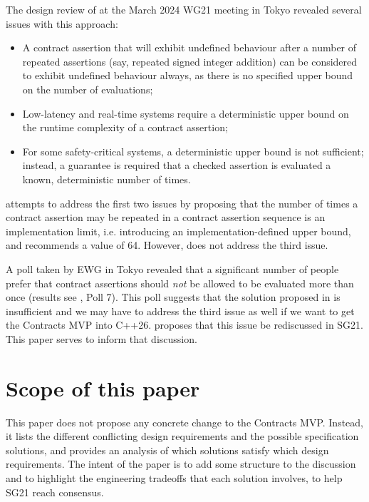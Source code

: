 The design review of \cite{P2900R6} at the March 2024 WG21 meeting in Tokyo revealed several issues with this approach:
\begin{itemize}
\item A contract assertion that will exhibit undefined behaviour after a number of repeated assertions (say, repeated signed integer addition) can be considered to exhibit undefined behaviour always, as there is no specified upper bound on the number of evaluations;
\item Low-latency and real-time systems require a deterministic upper bound on the runtime complexity of a contract assertion;
\item For some safety-critical systems, a deterministic upper bound is not sufficient; instead, a guarantee is required that a checked assertion is evaluated a known, deterministic number of times.
\end{itemize} 

\cite{P3119R0} attempts to address the first two issues by proposing that the number of times a contract assertion may be repeated in a contract assertion sequence is an implementation limit, i.e. introducing an implementation-defined upper bound, and recommends a value of 64. However, \cite{P3119R0} does not address the third issue.

\pagebreak %

 A poll taken by EWG in Tokyo revealed that a significant number of people prefer that contract assertions should \emph{not} be allowed to be evaluated more than once (results see \cite{D3197R0}, Poll 7). This poll suggests that the solution proposed in \cite{P3119R0} is insufficient and we may have to address the third issue as well if we want to get the Contracts MVP into C++26. \cite{D3197R0} proposes that this issue be rediscussed in SG21. This paper serves to inform that discussion.


\section{Scope of this paper}

This paper does not propose any concrete change to the Contracts MVP. Instead, it lists the different conflicting design requirements and the possible specification solutions, and provides an analysis of which solutions satisfy which design requirements. The intent of the paper is to add some structure to the discussion and to highlight the engineering tradeoffs that each solution involves, to help SG21 reach consensus.

